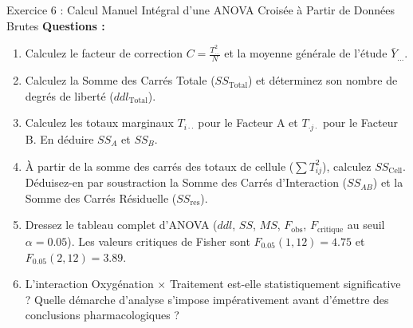 \documentclass[11pt,a4paper]{article}
\begin{document}
\begin{exercicebox}{Exercice 6 : Calcul Manuel Intégral d'une ANOVA Croisée à Partir de Données Brutes}
\textbf{Questions :}
\begin{enumerate}[label=\textbf{\alph*.}]
  \item Calculez le facteur de correction $C = \frac{T_{\dots}^2}{N}$ et la moyenne générale de l'étude $\bar{Y}_{\dots}$.
  \item Calculez la Somme des Carrés Totale ($SS_{\text{Total}}$) et déterminez son nombre de degrés de liberté ($ddl_{\text{Total}}$).
  \item Calculez les totaux marginaux $T_{i\cdot\cdot}$ pour le Facteur A et $T_{\cdot j\cdot}$ pour le Facteur B. En déduire $SS_A$ et $SS_B$.
  \item À partir de la somme des carrés des totaux de cellule ($\sum T_{ij}^2$), calculez $SS_{\text{Cell}}$. Déduisez-en par soustraction la Somme des Carrés d'Interaction ($SS_{AB}$) et la Somme des Carrés Résiduelle ($SS_{\text{res}}$).
  \item Dressez le tableau complet d'ANOVA ($ddl$, $SS$, $MS$, $F_{\text{obs}}$, $F_{\text{critique}}$ au seuil $\alpha = 0.05$). Les valeurs critiques de Fisher sont $F_{0.05}(1, 12) = 4.75$ et $F_{0.05}(2, 12) = 3.89$.
  \item L'interaction Oxygénation $\times$ Traitement est-elle statistiquement significative ? Quelle démarche d'analyse s'impose impérativement avant d'émettre des conclusions pharmacologiques ?
\end{enumerate}
\end{exercicebox}
\end{document}
